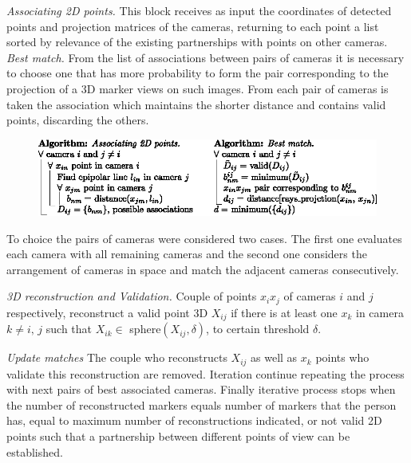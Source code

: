 \textit{Associating 2D points.}\label{seccion_asociar2D_uno}
%
This block receives as input the coordinates of detected points and projection matrices of the cameras, returning to each point a list sorted by relevance of the existing partnerships with points on other cameras. \\ 
\textit{\hspace*{0.5cm}Best match.}\label{MejorAsociacion}
%
From the list of associations between pairs of cameras it is necessary to choose one that has more probability to form the pair corresponding to the projection of a 3D marker views on such images.
%
From each pair of cameras is taken the association which maintains the shorter distance and contains valid points, discarding the others. 
\begin{figure}
    \begin{center}
       \includegraphics[scale=1.0]{./imagenes/Reconstruccion/Algoritmo_reconstruccion}       
    \end{center}
\end{figure}
%
To choice the pairs of cameras were considered two cases.
The first one evaluates each camera with all remaining cameras and the second one considers the arrangement of cameras in space and match the adjacent cameras consecutively.

\textit{3D reconstruction and Validation.}\label{seccion_reconstruccion3D_validacion}
Couple of points $x_i x_j$ of cameras $i$ and $j$ respectively, reconstruct a valid point 3D $X_{ij}$ if there is at least one $x_k$ in camera $k\not= i, \,j$ such that $X_{ik} \in $ sphere$(X_{ij}, \delta)$, to certain threshold $\delta$.

\textit{Update matches}\label{actualizar_asociaciones}
The couple who reconstructs $X_{ij}$ as well as $x_k$ points who validate this reconstruction are removed. 
Iteration continue repeating the process with next pairs of best associated cameras.
Finally iterative process stops when the number of reconstructed markers equals number of markers that the person has, equal to maximum number of reconstructions indicated, or not valid 2D points such that a partnership between different points of view can be established.